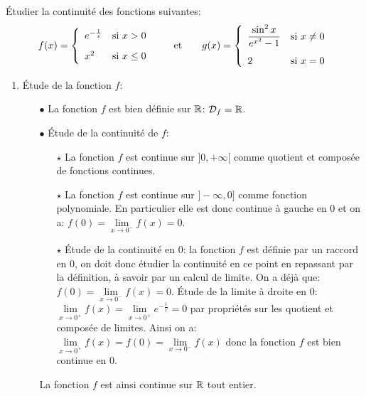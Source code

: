 \documentclass[a4paper, 11pt,reqno]{article}
\begin{document}
\begin{exercice}  \;
	\'Etudier la continuit\'e des fonctions suivantes:
	$$
		f(x)=\left\lbrace \begin{array}{ll}e^{-\frac{1}{x}}& \hbox{si}\ x>0\vsec\\ x^2 &\hbox{si}\ x\leq 0  \end{array}\right.\qquad \hbox{et}\qquad
		g(x)=\left\lbrace \begin{array}{ll} \ddp\frac{\sin^2{x}}{e^{x^2}-1} & \hbox{si}\ x\not= 0\vsec \\
             2                                    & \hbox{si}\ x=0\end{array}\right.
	$$
\end{exercice}
\begin{correction}  \;
	\begin{enumerate}
		\item \'Etude de la fonction $f$:
		      \begin{itemize}
			      \item[$\bullet$] La fonction $f$ est bien d\'efinie sur $\mathbb{R}$: $\mathcal{D}_f=\mathbb{R}$.
			      \item[$\bullet$] \'Etude de la continuit\'e de $f$:
			            \begin{itemize}
				            \item[$\star$] La fonction $f$ est continue sur $\rbrack 0,+\infty\lbrack$ comme quotient et compos\'ee de fonctions continues.
				            \item[$\star$] La fonction $f$ est continue sur $\rbrack -\infty,0\rbrack$ comme fonction polynomiale. En particulier elle est donc continue \`{a} gauche en 0 et on a: $f(0)=\lim\limits_{x\to 0^-} f(x)=0$.
				            \item[$\star$] \'Etude de la continuit\'e en 0: la fonction $f$ est d\'efinie par un raccord en 0, on doit donc \'etudier la continuit\'e en ce point en repassant par la d\'efinition, \`{a} savoir par un calcul de limite. On a d\'ej\`{a} que: $f(0)=\lim\limits_{x\to 0^-} f(x)=0$. \'Etude de la limite \`{a} droite en 0: $\lim\limits_{x\to 0^+} f(x)=\lim\limits_{x\to 0^+} e^{-\frac{1}{x}}=0$ par propri\'et\'es sur les quotient et compos\'ee de limites. Ainsi on a: $\lim\limits_{x\to 0^+}f(x)=f(0)=\lim\limits_{x\to 0^-} f(x)$ donc la fonction $f$ est bien continue en 0.
			            \end{itemize}
			            La fonction $f$ est ainsi continue sur $\mathbb{R}$ tout entier.
		      \end{itemize}

\end{enumerate}
\end{correction}
\end{document}
